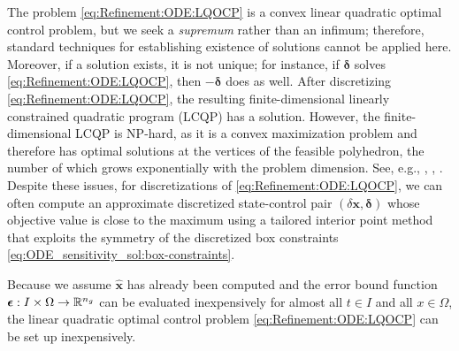 \documentclass[onefignum,onetabnum]{siamart220329}
\numberwithin{equation}{section}
\newcommand {\real} {\mathbb{R}}
\newcommand{\bx}{\ensuremath{\mathbf{x}}} %
\newcommand {\bdelta} {\boldsymbol{\delta}}
\newcommand {\bepsilon} {\mbox{\boldmath $\epsilon$}}
\begin{document}
The problem \eqref{eq:Refinement:ODE:LQOCP} is a convex linear quadratic optimal control problem,
but we seek a {\em supremum} rather than an infimum; therefore, standard techniques for establishing existence of solutions cannot be applied here.
Moreover, if a solution exists, it is not unique; for instance, if $\bdelta$ solves \eqref{eq:Refinement:ODE:LQOCP}, then $- \bdelta$ does as well. 
After discretizing \eqref{eq:Refinement:ODE:LQOCP}, the resulting finite-dimensional linearly constrained quadratic program (LCQP)  has a solution.
However, the finite-dimensional LCQP is NP-hard, 
as it is a convex maximization problem and therefore has optimal solutions at the vertices of the feasible polyhedron, the number of which grows exponentially 
with the problem dimension. See, e.g., \cite{HPBenson_1995a},
\cite{SBurer_ANLetchford_2009a}, \cite{RHorst_PMPardalos_NVThoai_2000a}.
Despite these issues, for discretizations of \eqref{eq:Refinement:ODE:LQOCP},
we can often compute an approximate discretized state-control pair $(\delta \bx, \bdelta)$ whose objective value is close
to the maximum
using a tailored interior point method that exploits the symmetry of the discretized box constraints \eqref{eq:ODE_sensitivity_sol:box-constraints}.

Because we assume $\widehat{\bx}$ has already been computed and the error bound function $\bepsilon: I \times \Omega \rightarrow \real^{n_g}$ 
can be evaluated inexpensively for almost all $t \in I$ and all $x \in \Omega$,
the linear quadratic optimal control problem \eqref{eq:Refinement:ODE:LQOCP} can be set up inexpensively.
\end{document}
